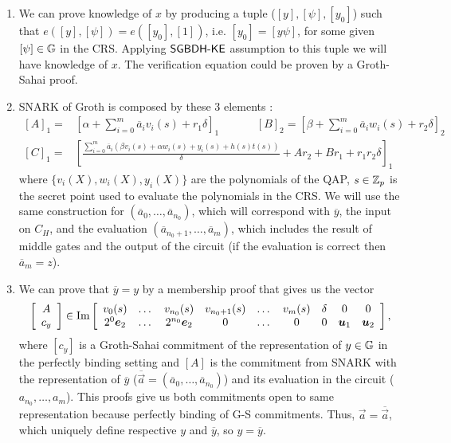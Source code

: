 \begin{enumerate}
	\item We can prove knowledge of $x$ by producing a tuple ($[y], [\psi], [y_0]$) such that $e([y],[\psi])=e([y_0],[1])$, i.e. $[y_0]=[y \psi]$, for some given $[\psi] \in \mathbb{G}$ in the CRS. Applying $\mathsf{SGBDH\mbox{-}KE}$ assumption to this tuple we will have knowledge of $x$. The verification equation could be proven by a Groth-Sahai proof.
	\item SNARK of Groth is composed by these 3 elements \cite{EC:Groth16}:
	\[\begin{split}
	[A]_1 = &\left[\alpha + \sum_{i=0}^m \overline{a}_i v_i(s) + r_1 \delta\right]_1  \hspace{40pt} [B]_2 = \left[\beta + \sum_{i=0}^m \overline{a}_i w_i(s) + r_2 \delta\right]_2\\
	[C]_1 = &\left[\frac{\sum_{i=0}^m \overline{a}_i\left(\beta v_i(s)+\alpha w_i(s)+y_i(s)+h(s)t(s)\right)}{\delta}+Ar_2+B r_1+ r_1r_2\delta \right]_1
	\end{split}\]
	where $\{v_i(X),w_i(X),y_i(X)\}$ are the polynomials of the QAP, $s\in \mathbb{Z}_p$ is the secret point used to evaluate the polynomials in the CRS.
	We will use the same construction for $(\overline{a}_0,\dots,\overline{a}_{n_0})$, which will correspond with $\overline{y}$, the input on $C_H$, and the evaluation $(\overline{a}_{n_0+1},\dots,\overline{a}_m)$, which includes the result of middle gates and the output of the circuit (if the evaluation is correct then $\overline{a}_m=z$).
	\item We can prove that $\overline{y}=y$ by a membership proof that gives us the vector
	$$\left[\begin{array}{c}
	A\\
	c_y\\
	\end{array}\right] \in \text{Im}\left[\begin{array}{c c c c c c c c c}
	v_0(s) & \dots & v_{n_0}(s) & v_{n_0+1}(s) & \dots & v_{m}(s) &\delta & 0 & 0 \\
	2^0\vec{e}_2 & \dots & 2^{n_0} \vec{e}_2 & 0 &\dots &0 & 0 & \vec{u}_1 & \vec{u}_2\\
	\end{array}\right],$$
	where $[c_y]$ is a Groth-Sahai commitment of the representation of $y \in \mathbb{G}$ in the perfectly binding setting and $[A]$ is the commitment from SNARK with the representation of $\overline{y}$ ($\overline{\vec{a}}=(\overline{a}_0,\dots,\overline{a}_{n_0})$) and its evaluation in the circuit ($a_{n_0},\dots,a_m$). This proofs give us both commitments open to same representation because perfectly binding of G-S commitments. Thus, $\vec{a} = \overline{\vec{a}}$, which uniquely define respective $y$ and $\overline{y}$, so $y=\overline{y}$.
\end{enumerate}


